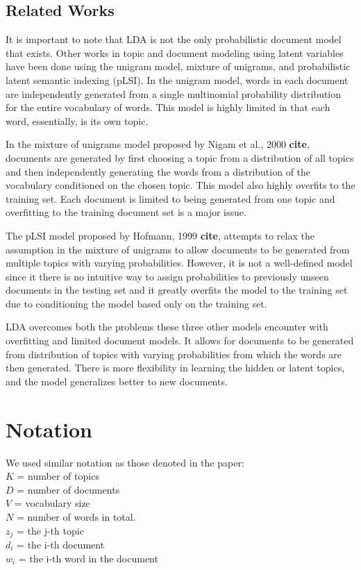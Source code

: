 \documentclass{article} %
\begin{document}
\subsection{Related Works}
It is important to note that LDA is not the only probabilistic document model that exists. Other works in topic and 
document modeling using latent variables have been done using the unigram model, mixture of unigrams, and 
probabilistic latent semantic indexing (pLSI). In the unigram model, words in each document are independently 
generated from a single multinomial probability distribution for the entire vocabulary of words. This model is highly
 limited in that each word, 
essentially, is its own topic. 

In the mixture of unigrams model proposed by Nigam et al., 2000 \textbf{cite}, documents are
generated by first choosing a topic from a distribution of all topics and then independently generating the words 
from a distribution of the vocabulary conditioned on the chosen topic. This model also highly overfits to the
 training set.
 Each document is limited to being 
generated from one topic and overfitting to the training document set is a major issue. 

The pLSI model proposed by Hofmann, 1999 \textbf{cite}, attempts to relax the assumption in the 
mixture of unigrams to allow documents to be generated from multiple topics with varying probabilities. However,
 it is not a well-defined model since it there is no intuitive way to assign probabilities to previously unseen 
documents in the testing set and it greatly overfits the model to the training set due to conditioning the model 
based only on the training set.

LDA overcomes both the problems these three other models encounter with overfitting and limited document 
models. It allows for documents to be generated from distribution of topics with varying probabilities from which 
the words are then generated. There is more flexibility in learning the 
hidden or latent topics, and the model generalizes better to new documents.

\section{Notation}
We used similar notation as those denoted in the paper: \\
$K$ = number of topics\\
$D$ = number of documents\\
$V$ = vocabulary size\\
$N$ =  number of words in total.\\
$z_j$ = the j-th topic\\
$d_i$ = the i-th document\\
$w_i$ = the i-th word in the document\\
\end{document}
